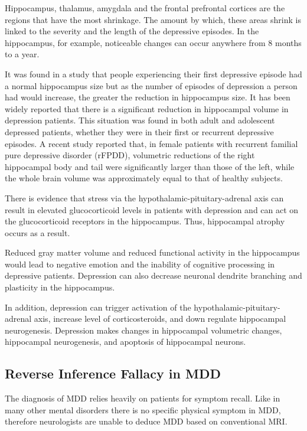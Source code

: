 \documentclass{article}
\begin{document}
Hippocampus, thalamus, amygdala and the frontal prefrontal cortices
are the regions that have the most shrinkage. The amount by which,
these areas shrink is linked to the severity and the length of the
depressive episodes. In the hippocampus, for example, noticeable
changes can occur anywhere from 8 months to a year.

It was found in a study that people experiencing their first
depressive episode had a normal hippocampus size but as the number of
episodes of depression a person had would increase, the greater the
reduction in hippocampus size. It has been widely reported that there
is a significant reduction in hippocampal volume in depression
patients.  This situation was found in both adult and adolescent
depressed patients, whether they were in their first or recurrent
depressive episodes. A recent study reported that, in female patients
with recurrent familial pure depressive disorder (rFPDD), volumetric
reductions of the right hippocampal body and tail were significantly
larger than those of the left, while the whole brain volume was
approximately equal to that of healthy subjects.

There is evidence that stress via the hypothalamic-pituitary-adrenal
axis can result in elevated glucocorticoid levels in patients with
depression and can act on the glucocorticoid receptors in the
hippocampus. Thus, hippocampal atrophy occurs as a result.

Reduced gray matter volume and reduced functional activity in the
hippocampus would lead to negative emotion and the inability of
cognitive processing in depressive patients.  Depression can also
decrease neuronal dendrite branching and plasticity in the
hippocampus.

In addition, depression can trigger activation of the
hypothalamic-pituitary-adrenal axis, increase level of
corticosteroids, and down regulate hippocampal neurogenesis.
Depression makes changes in hippocampal volumetric changes,
hippocampal neurogenesis, and apoptosis of hippocampal neurons.

\subsection{Reverse Inference Fallacy in MDD}

The diagnosis of MDD relies heavily on patients for symptom recall.
Like in many other mental disorders there is no specific physical
symptom in MDD, therefore neurologists are unable to deduce MDD based
on conventional MRI.
\end{document}
